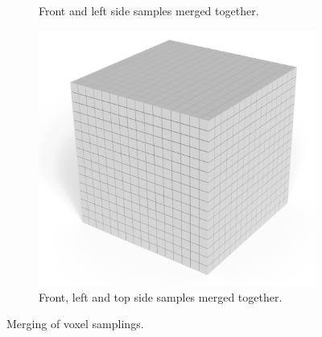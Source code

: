 \begin{figure}[h]
\begin{subfigure}[t]{0.3\textwidth}
        \caption{Front and left side samples merged together.}
    \end{subfigure}
    \hfill
    \begin{subfigure}[t]{0.3\textwidth}
        \centering
        \includegraphics[width=\textwidth]{sections/methodology/figures/voxels-merge-3.png}
        \caption{Front, left and top side samples merged together.}
    \end{subfigure}
       \caption{Merging of voxel samplings.}
       \label{fig:voxel-sample-merging}
\end{figure}

